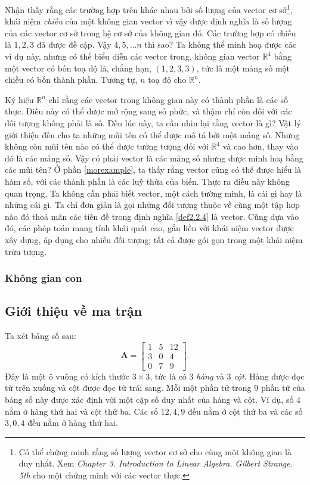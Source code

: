 Nhận thấy rằng các trường hợp trên khác nhau bởi số lượng của vector cơ sở\footnote{Có thể chứng minh rằng số lượng vector cơ sở cho cùng một không gian là duy nhẩt. Xem \emph{Chapter 3. Introduction to Linear Algebra. Gilbert Strange. 5th} cho một chứng minh với các vector thực.}, khái niệm \emph{chiều} của một không gian vector vì vậy dược định nghĩa là số lượng của các vector cơ sở trong hệ cơ sở của không gian đó. Các trường hợp có chiều là \(1,2,3\) đã được đề cập. Vậy \(4,5,\dots n\) thì sao? Ta không thể minh hoạ được các ví dụ này, nhưng có thể biểu diễn các vector trong, không gian vector \(\mathbb{R}^4\) bằng một vector có bốn toạ độ là, chẳng hạn, \((1,2,3,3)\), tức là một mảng số một chiều có bốn thành phần. Tương tự, \(n\) toạ độ cho \(\mathbb{R}^n\).
\vspace{8pt}

Ký hiệu \(\mathbb{R}^n\) chỉ rằng các vector trong không gian này có thành phần là các số thực. Điều này có thể được mở rộng sang số phức, và thậm chí còn đối với các đối tượng không phải là số. Đến lúc này, ta cần nhìn lại rằng vector là gì? Vật lý giới thiệu đến cho ta những mũi tên có thể được mô tả bởi một mảng số. Nhưng không còn mũi tên nào có thể được tưởng tượng đối với 
\(\mathbb{R}^4\) và cao hơn, thay vào đó là các mảng số. Vậy có phải vector là các mảng số nhưng được minh hoạ bằng các mũi tên? Ở phần \ref{morexample}, ta thấy rằng vector cũng có thể được hiểu là hàm số, với các thành phần là các luỹ thừa của biến. Thực ra điều này không quan trọng. 
Ta không cần phải biết vector, một cách tường minh, là cái gì hay là những cái gì. Ta chỉ đơn giản là gọi những đối tượng thuộc về cùng một tập hợp nào đó thoả mãn các tiên đề trong định nghĩa \ref{def2.2.4} là vector. Cũng dựa vào đó, các phép toán mang tính khái quát cao, gắn liền với khái niệm vector được xây dựng, áp dụng cho nhiều đối tượng; tất cả được gói gọn trong một khái niệm trừu tượng.

\subsubsection*{Không gian con}



\subsection{Giới thiệu về ma trận}
Ta xét bảng số sau:
\[ \mathbf{A}=
\begin{bmatrix}
    1&5&12\\
    3&0&4\\
    0&7&9
\end{bmatrix}.
\]
Đây là một ô vuông có kích thước \(3\times 3\), tức là có \(3\) \emph{hàng} và \(3\) \emph{cột}. Hàng được đọc từ trên xuống và cột được đọc từ trái sang. Mỗi một phần tử  trong \(9\) phần tử  của bảng số này được xác định với một cặp số duy nhất của hàng và cột. Ví dụ, số \(4\) nằm ở hàng thứ hai và cột thứ ba. 
Các số \(12,4,9\) đều nằm ở cột thứ ba và các số \(3,0,4\) đều nằm ở hàng thứ hai. 

